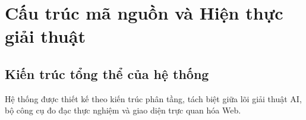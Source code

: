 \documentclass[a4paper]{article}
\begin{document}
\newpage

\section{Cấu trúc mã nguồn và Hiện thực giải thuật}

\subsection{Kiến trúc tổng thể của hệ thống}
Hệ thống được thiết kế theo kiến trúc phân tầng, tách biệt giữa lõi giải thuật AI, bộ công cụ đo đạc thực nghiệm và giao diện trực quan hóa Web.
\end{document}
